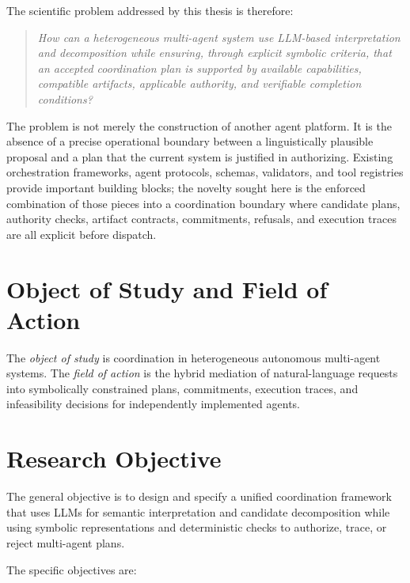The scientific problem addressed by this thesis is therefore:

\begin{quote}
\emph{How can a heterogeneous multi-agent system use LLM-based interpretation and decomposition while ensuring, through explicit symbolic criteria, that an accepted coordination plan is supported by available capabilities, compatible artifacts, applicable authority, and verifiable completion conditions?}
\end{quote}

The problem is not merely the construction of another agent platform. It is the absence of a precise operational boundary between a linguistically plausible proposal and a plan that the current system is justified in authorizing. Existing orchestration frameworks, agent protocols, schemas, validators, and tool registries provide important building blocks; the novelty sought here is the enforced combination of those pieces into a coordination boundary where candidate plans, authority checks, artifact contracts, commitments, refusals, and execution traces are all explicit before dispatch.

\section{Object of Study and Field of Action}

The \emph{object of study} is coordination in heterogeneous autonomous multi-agent systems. The \emph{field of action} is the hybrid mediation of natural-language requests into symbolically constrained plans, commitments, execution traces, and infeasibility decisions for independently implemented agents.

\section{Research Objective}

The general objective is to design and specify a unified coordination framework that uses LLMs for semantic interpretation and candidate decomposition while using symbolic representations and deterministic checks to authorize, trace, or reject multi-agent plans.

The specific objectives are:

